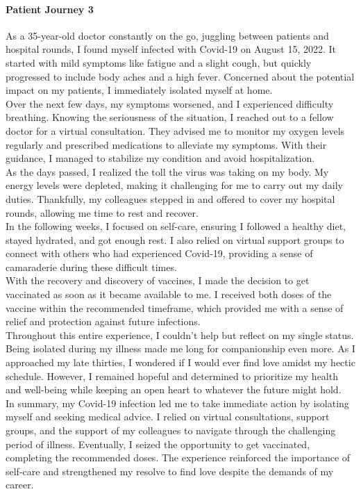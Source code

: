 \paragraph{Patient Journey 3}\label{apx:pj3}
As a 35-year-old doctor constantly on the go, juggling between patients and hospital rounds, I found myself infected with Covid-19 on August 15, 2022. It started with mild symptoms like fatigue and a slight cough, but quickly progressed to include body aches and a high fever. Concerned about the potential impact on my patients, I immediately isolated myself at home.\\
Over the next few days, my symptoms worsened, and I experienced difficulty breathing. Knowing the seriousness of the situation, I reached out to a fellow doctor for a virtual consultation. They advised me to monitor my oxygen levels regularly and prescribed medications to alleviate my symptoms. With their guidance, I managed to stabilize my condition and avoid hospitalization.\\
As the days passed, I realized the toll the virus was taking on my body. My energy levels were depleted, making it challenging for me to carry out my daily duties. Thankfully, my colleagues stepped in and offered to cover my hospital rounds, allowing me time to rest and recover.\\
In the following weeks, I focused on self-care, ensuring I followed a healthy diet, stayed hydrated, and got enough rest. I also relied on virtual support groups to connect with others who had experienced Covid-19, providing a sense of camaraderie during these difficult times.\\
With the recovery and discovery of vaccines, I made the decision to get vaccinated as soon as it became available to me. I received both doses of the vaccine within the recommended timeframe, which provided me with a sense of relief and protection against future infections.\\
Throughout this entire experience, I couldn't help but reflect on my single status. Being isolated during my illness made me long for companionship even more. As I approached my late thirties, I wondered if I would ever find love amidst my hectic schedule. However, I remained hopeful and determined to prioritize my health and well-being while keeping an open heart to whatever the future might hold.\\
In summary, my Covid-19 infection led me to take immediate action by isolating myself and seeking medical advice. I relied on virtual consultations, support groups, and the support of my colleagues to navigate through the challenging period of illness. Eventually, I seized the opportunity to get vaccinated, completing the recommended doses. The experience reinforced the importance of self-care and strengthened my resolve to find love despite the demands of my career.
